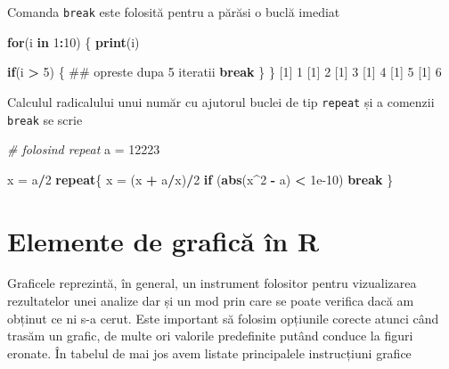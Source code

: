 \documentclass[]{article}
\newenvironment{Shaded}{\begin{snugshade}}{\end{snugshade}}
\newcommand{\KeywordTok}[1]{\textcolor[rgb]{0.13,0.29,0.53}{\textbf{#1}}}
\newcommand{\DecValTok}[1]{\textcolor[rgb]{0.00,0.00,0.81}{#1}}
\newcommand{\FloatTok}[1]{\textcolor[rgb]{0.00,0.00,0.81}{#1}}
\newcommand{\StringTok}[1]{\textcolor[rgb]{0.31,0.60,0.02}{#1}}
\newcommand{\CommentTok}[1]{\textcolor[rgb]{0.56,0.35,0.01}{\textit{#1}}}
\newcommand{\ControlFlowTok}[1]{\textcolor[rgb]{0.13,0.29,0.53}{\textbf{#1}}}
\newcommand{\OperatorTok}[1]{\textcolor[rgb]{0.81,0.36,0.00}{\textbf{#1}}}
\newcommand{\NormalTok}[1]{#1}
\begin{document}
Comanda \texttt{break} este folosită pentru a părăsi o buclă imediat

\begin{Shaded}
\begin{Highlighting}[]
\ControlFlowTok{for}\NormalTok{(i }\ControlFlowTok{in} \DecValTok{1}\OperatorTok{:}\DecValTok{10}\NormalTok{) \{}
      \KeywordTok{print}\NormalTok{(i)}

      \ControlFlowTok{if}\NormalTok{(i }\OperatorTok{>}\StringTok{ }\DecValTok{5}\NormalTok{) \{}
\NormalTok{              ## opreste dupa 5 iteratii}
              \ControlFlowTok{break}  
\NormalTok{      \}     }
\NormalTok{\}}
\NormalTok{[}\DecValTok{1}\NormalTok{] }\DecValTok{1}
\NormalTok{[}\DecValTok{1}\NormalTok{] }\DecValTok{2}
\NormalTok{[}\DecValTok{1}\NormalTok{] }\DecValTok{3}
\NormalTok{[}\DecValTok{1}\NormalTok{] }\DecValTok{4}
\NormalTok{[}\DecValTok{1}\NormalTok{] }\DecValTok{5}
\NormalTok{[}\DecValTok{1}\NormalTok{] }\DecValTok{6}
\end{Highlighting}
\end{Shaded}

Calculul radicalului unui număr cu ajutorul buclei de tip
\texttt{repeat} și a comenzii \texttt{break} se scrie

\begin{Shaded}
\begin{Highlighting}[]
\CommentTok{# folosind repeat}
\NormalTok{a =}\StringTok{ }\DecValTok{12223}

\NormalTok{x =}\StringTok{ }\NormalTok{a}\OperatorTok{/}\DecValTok{2}
\ControlFlowTok{repeat}\NormalTok{\{}
\NormalTok{  x =}\StringTok{ }\NormalTok{(x }\OperatorTok{+}\StringTok{ }\NormalTok{a}\OperatorTok{/}\NormalTok{x)}\OperatorTok{/}\DecValTok{2}
  \ControlFlowTok{if}\NormalTok{ (}\KeywordTok{abs}\NormalTok{(x}\OperatorTok{^}\DecValTok{2} \OperatorTok{-}\StringTok{ }\NormalTok{a) }\OperatorTok{<}\StringTok{ }\FloatTok{1e-10}\NormalTok{) }\ControlFlowTok{break}
\NormalTok{\}}
\end{Highlighting}
\end{Shaded}

\section{Elemente de grafică în R}\label{elemente-de-grafica-in-r}

Graficele reprezintă, în general, un instrument folositor pentru
vizualizarea rezultatelor unei analize dar și un mod prin care se poate
verifica dacă am obținut ce ni s-a cerut. Este important să folosim
opțiunile corecte atunci când trasăm un grafic, de multe ori valorile
predefinite putând conduce la figuri eronate. În tabelul de mai jos avem
listate principalele instrucțiuni grafice
\end{document}
